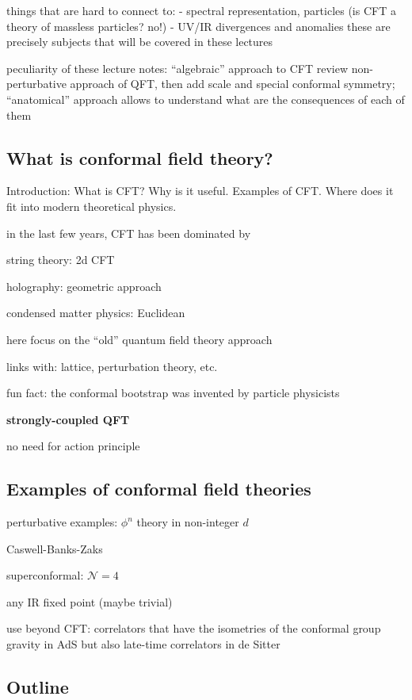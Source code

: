 \documentclass[a4paper,12pt]{article}
\numberwithin{equation}{section}
\begin{document}
things that are hard to connect to:
- spectral representation, particles (is CFT a theory of massless particles? no!)
- UV/IR divergences and anomalies
these are precisely subjects that will be covered in these lectures

peculiarity of these lecture notes:
``algebraic'' approach to CFT
review non-perturbative approach of QFT, then add scale and special conformal symmetry;
``anatomical'' approach allows to understand what are the consequences of each of them



\subsection{What is conformal field theory?}

Introduction: What is CFT? Why is it useful. Examples of CFT. Where does it fit into modern theoretical physics.


in the last few years, CFT has been dominated by 

string theory: 2d CFT

holography: geometric approach

condensed matter physics: Euclidean


here focus on the ``old'' quantum field theory approach

links with: lattice, perturbation theory, etc.

fun fact: the conformal bootstrap was invented by particle physicists


\textbf{strongly-coupled QFT}

no need for action principle


\subsection{Examples of conformal field theories}

perturbative examples: $\phi^n$ theory in non-integer $d$

Caswell-Banks-Zaks

superconformal: $\mathcal{N} = 4$


any IR fixed point (maybe trivial)


use beyond CFT:
correlators that have the isometries of the conformal group
gravity in AdS
but also late-time correlators in de Sitter

\subsection{Outline}
\end{document}
